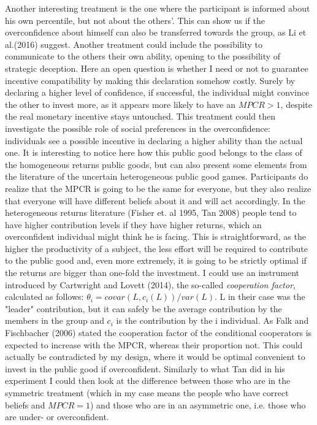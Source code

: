 \documentclass[11pt,twoside,a4paper,leqno]{article}
\begin{document}
Another interesting treatment is the one where the participant is informed about his own percentile, but not about the others'. This can show us if the overconfidence about himself can also be transferred towards the group, as Li et al.(2016)\textsuperscript{\cite{Li}} suggest. Another treatment could include the possibility to communicate to the others their own ability, opening to the possibility of strategic deception. Here an open question is whether I need or not to guarantee incentive compatibility by making this declaration somehow costly. Surely by declaring a higher level of confidence, if successful, the individual might convince the other to invest more, as it appears more likely to have an $MPCR > 1$, despite the real monetary incentive stays untouched. This treatment could then investigate the possible role of social preferences in the overconfidence: individuals see a possible incentive in declaring a higher ability than the actual one. \newline
It is interesting to notice here how this public good belongs to the class of the homogeneous returns public goods, but can also present some elements from the literature of the uncertain heterogeneous public good games. Participants do realize that the MPCR is going to be the same for everyone, but they also realize that everyone will have different beliefs about it and will act accordingly. In the heterogeneous returns literature (Fisher et. al 1995\textsuperscript{\cite{Fisher}}, Tan 2008\textsuperscript{\cite{Tan}}) people tend to have higher contribution levels if they have higher returns, which an overconfident individual might think he is facing. This is straightforward, as the higher the productivity of a subject, the less effort will be required to contribute to the public good and, even more extremely, it is going to be strictly optimal if the returns are bigger than one-fold the investment. I could use an instrument introduced by Cartwright and Lovett (2014)\textsuperscript{\cite{Cart}}, the so-called \textit{cooperation factor}, calculated as follows: $\theta _{i} = covar(L,c_{i}(L))/var(L)$. L in their case was the "leader" contribution, but it can safely be the average contribution by the members in the group and $c_{i}$ is the contribution by the i individual. As Falk and Fischbacher (2006)\textsuperscript{\cite{Falk}} stated the cooperation factor of the conditional cooperators is expected to increase with the MPCR, whereas their proportion not. This could actually be contradicted by my design, where it would be optimal convenient to invest in the public good if overconfident. Similarly to what Tan did in his experiment I could then look at the difference between those who are in the symmetric treatment (which in my case means the people who have correct beliefs and $MPCR=1$) and those who are in an asymmetric one, i.e. those who are under- or overconfident.
\end{document}
